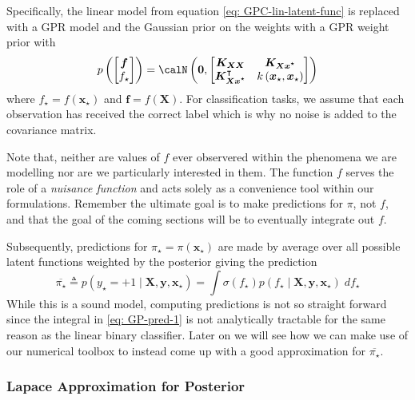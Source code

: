 Specifically, the linear model from equation \ref{eq: GPC-lin-latent-func} is replaced with a GPR model and the Gaussian prior on the weights with a GPR weight prior with
\begin{equation*}
    p \left(
    \begin{bmatrix}
            \bm{f} \\
            f_{\star}
        \end{bmatrix}
    \right)
    =
    \calN \left( \bm{0} ,
    \begin{bmatrix}
        \bm{K_{XX}}                     & \bm{K_{Xx^{\star}}}                             \\
        \bm{K_{Xx^{\star}}}^{\intercal} & k \left( \bm{x}_{\star}, \bm{x}_{\star} \right)
    \end{bmatrix}
    \right)
\end{equation*}
where $f_{\star} = f ( \bm{x}_{\star} )$ and $\bm{f} = f \left( \bm{X} \right)$. For classification tasks, we assume that each observation has received the correct label which is why no noise is added to the covariance matrix.

Note that, neither are values of $f$ ever observered within the phenomena we are modelling nor are we particularly interested in them. The function $f$ serves the role of a {\it nuisance function} and acts solely as a convenience tool within our formulations. Remember the ultimate goal is to make predictions for $\pi$, not $f$, and that the goal of the coming sections will be to eventually integrate out $f$.

Subsequently, predictions for $\pi_{\star} = \pi \left( \bm{x}_{\star} \right)$ are made by average over all possible latent functions weighted by the posterior giving the prediction
\begin{equation} \label{eq: GP-pred-1}
    \overline{\pi_{\star}} \triangleq p \left( y_{\star} = +1 \mid \bm{X} , \bm{y} , \bm{x}_{\star} \right) = \int \sigma \left( f_{\star} \right) p \left( f_{\star} \mid \bm{X} , \bm{y} , \bm{x}_{\star} \right) \; d f_{\star}
\end{equation}
While this is a sound model, computing predictions is not so straight forward since the integral in \ref{eq: GP-pred-1} is not analytically tractable for the same reason as the linear binary classifier. Later on we will see how we can make use of our numerical toolbox to instead come up with a good approximation for $\overline{\pi_{\star}}$.

\subsubsection{Lapace Approximation for Posterior}\label{Section1.6.2}

